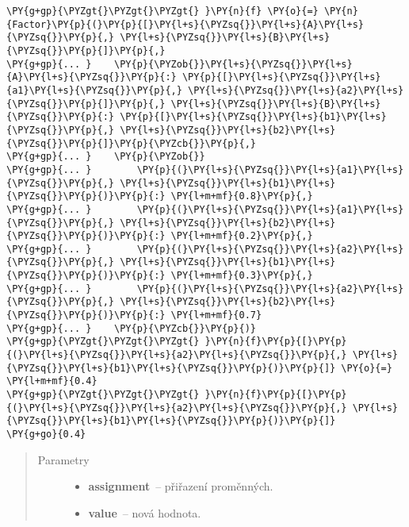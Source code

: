 \begin{fulllineitems}
\begin{fulllineitems}
\begin{Verbatim}[commandchars=\\\{\}]
\PY{g+gp}{\PYZgt{}\PYZgt{}\PYZgt{} }\PY{n}{f} \PY{o}{=} \PY{n}{Factor}\PY{p}{(}\PY{p}{[}\PY{l+s}{\PYZsq{}}\PY{l+s}{A}\PY{l+s}{\PYZsq{}}\PY{p}{,} \PY{l+s}{\PYZsq{}}\PY{l+s}{B}\PY{l+s}{\PYZsq{}}\PY{p}{]}\PY{p}{,}
\PY{g+gp}{... }    \PY{p}{\PYZob{}}\PY{l+s}{\PYZsq{}}\PY{l+s}{A}\PY{l+s}{\PYZsq{}}\PY{p}{:} \PY{p}{[}\PY{l+s}{\PYZsq{}}\PY{l+s}{a1}\PY{l+s}{\PYZsq{}}\PY{p}{,} \PY{l+s}{\PYZsq{}}\PY{l+s}{a2}\PY{l+s}{\PYZsq{}}\PY{p}{]}\PY{p}{,} \PY{l+s}{\PYZsq{}}\PY{l+s}{B}\PY{l+s}{\PYZsq{}}\PY{p}{:} \PY{p}{[}\PY{l+s}{\PYZsq{}}\PY{l+s}{b1}\PY{l+s}{\PYZsq{}}\PY{p}{,} \PY{l+s}{\PYZsq{}}\PY{l+s}{b2}\PY{l+s}{\PYZsq{}}\PY{p}{]}\PY{p}{\PYZcb{}}\PY{p}{,}
\PY{g+gp}{... }    \PY{p}{\PYZob{}}
\PY{g+gp}{... }        \PY{p}{(}\PY{l+s}{\PYZsq{}}\PY{l+s}{a1}\PY{l+s}{\PYZsq{}}\PY{p}{,} \PY{l+s}{\PYZsq{}}\PY{l+s}{b1}\PY{l+s}{\PYZsq{}}\PY{p}{)}\PY{p}{:} \PY{l+m+mf}{0.8}\PY{p}{,}
\PY{g+gp}{... }        \PY{p}{(}\PY{l+s}{\PYZsq{}}\PY{l+s}{a1}\PY{l+s}{\PYZsq{}}\PY{p}{,} \PY{l+s}{\PYZsq{}}\PY{l+s}{b2}\PY{l+s}{\PYZsq{}}\PY{p}{)}\PY{p}{:} \PY{l+m+mf}{0.2}\PY{p}{,}
\PY{g+gp}{... }        \PY{p}{(}\PY{l+s}{\PYZsq{}}\PY{l+s}{a2}\PY{l+s}{\PYZsq{}}\PY{p}{,} \PY{l+s}{\PYZsq{}}\PY{l+s}{b1}\PY{l+s}{\PYZsq{}}\PY{p}{)}\PY{p}{:} \PY{l+m+mf}{0.3}\PY{p}{,}
\PY{g+gp}{... }        \PY{p}{(}\PY{l+s}{\PYZsq{}}\PY{l+s}{a2}\PY{l+s}{\PYZsq{}}\PY{p}{,} \PY{l+s}{\PYZsq{}}\PY{l+s}{b2}\PY{l+s}{\PYZsq{}}\PY{p}{)}\PY{p}{:} \PY{l+m+mf}{0.7}
\PY{g+gp}{... }    \PY{p}{\PYZcb{}}\PY{p}{)}
\PY{g+gp}{\PYZgt{}\PYZgt{}\PYZgt{} }\PY{n}{f}\PY{p}{[}\PY{p}{(}\PY{l+s}{\PYZsq{}}\PY{l+s}{a2}\PY{l+s}{\PYZsq{}}\PY{p}{,} \PY{l+s}{\PYZsq{}}\PY{l+s}{b1}\PY{l+s}{\PYZsq{}}\PY{p}{)}\PY{p}{]} \PY{o}{=} \PY{l+m+mf}{0.4}
\PY{g+gp}{\PYZgt{}\PYZgt{}\PYZgt{} }\PY{n}{f}\PY{p}{[}\PY{p}{(}\PY{l+s}{\PYZsq{}}\PY{l+s}{a2}\PY{l+s}{\PYZsq{}}\PY{p}{,} \PY{l+s}{\PYZsq{}}\PY{l+s}{b1}\PY{l+s}{\PYZsq{}}\PY{p}{)}\PY{p}{]}
\PY{g+go}{0.4}
\end{Verbatim}
\begin{quote}\begin{description}
\item[{Parametry}] \leavevmode\begin{itemize}
\item {} 
\textbf{assignment}~-- přiřazení proměnných.

\item {} 
\textbf{value}~-- nová hodnota.

\end{itemize}


\end{description}
\end{quote}
\end{fulllineitems}
\end{fulllineitems}
